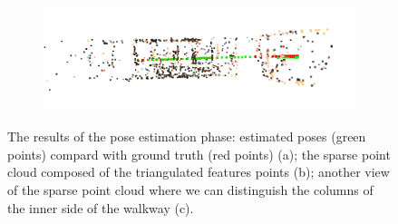 \begin{figure}[h]
\begin{subfigure}{0.45\linewidth}
\label{fig:trajectory2}
\end{subfigure}
\begin{subfigure}{\linewidth}
\includegraphics[width=\linewidth]{img/snapshot02.png}
\label{fig:trajectory3}
\end{subfigure}
\caption{The results of the pose estimation phase: estimated poses (green
points) compard with ground truth (red points) (a); the sparse point cloud
composed of the triangulated features points (b); another view of the sparse
point cloud where we can distinguish the columns of the inner side of the
walkway (c).}
\label{fig:trajectory}
\end{figure}
%
